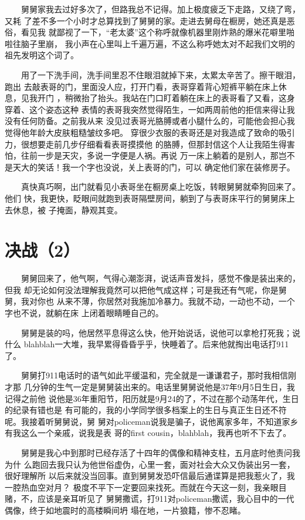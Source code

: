 \documentclass[12pt]{book}
\begin{document}
　　舅舅家我去过好多次了，但路我总不记得。加上极度疲乏下走路，又绕了弯，又耗
了差不多一个小时才总算找到了舅舅的家。走进去舅母在橱房，她还真是恶俗，看见我
就鄙视了一下，“老太婆”这个称呼就像机器里刚炸熟的爆米花噼里啪啦往脑子里崩，
我小声在心里叫上千遍万遍，不这么称呼她太对不起我们文明的祖先发明这个词了。

　　用了一下洗手间，洗手间里忍不住眼泪就掉下来，太累太辛苦了。擦干眼泪，跑出
去敲表哥的门，里面没人应，打开门看，表哥穿着背心短裤平躺在床上休息，见我开门
，稍微抬了抬头。我站在门口盯着躺在床上的表哥看了又看，这身穿着、这个姿态这种
表情的表哥我突然觉得陌生，一如两周前他的拒信来得让我没有任何防备。之前我从来
没见过表哥光胳膊或者小腿什么的，可能他会担心我觉得他年龄大皮肤粗糙皱纹多吧。
穿很少衣服的表哥还是对我造成了致命的吸引力，很想要走前几步仔细看看表哥摸摸他
的胳膊，但那封信这个人让我陌生得害怕，往前一步是天灾，多说一字便是人祸。再说
万一床上躺着的是别人，那岂不是天大的笑话！我一个字也没说，关上表哥的门，可以
确定他们家在装修房子。

　　真快真巧啊，出门就看见小表哥坐在橱房桌上吃饭，转眼舅舅就牵狗回来了。他们
快，我更快，眨眼间就跑到表哥隔壁房间，躺到了与表哥床平行的舅舅床上去休息，被
子掩面，静观其变。
\section{决战（2）}
\label{sec-8-31}

　　舅舅回来了，他气啊，气得心潮澎湃，说话声音发抖，感觉不像是装出来的，但我
却无论如何没法理解我竟然可以把他气成这样；可是我还有气呢，你是舅舅，我对你也
从来不薄，你居然对我施加冷暴力。我就不动，一动也不动，一个字也不说，就躺在床
上闭着眼睛睡自己的。

　　舅舅是装的吗，他居然平息得这么快，他开始说话，说他可以拿枪打死我；说什么
blahblah一大堆，我早累得昏昏乎乎，快睡着了。后来他就掏出电话打911了。

　　舅舅打911电话时的语气如此平缓温和，完全就是一谦谦君子，那时我相信刚才那
几分钟的生气一定是舅舅装出来的。电话里舅舅说他是37年9月5日生日，我记得之前他
说他是36年重阳节，阳历就是9月24的了，不过在那个动荡年代，生日的纪录有错也是
有可能的，我的小学同学很多档案上的生日与真正生日还不符呢。我接着听舅舅说，舅
舅对policeman说我是骗子，说他离家多年，不知道家乡有我这么一个亲戚，说我是表
哥的first cousin，blahblah，我再也听不下去了。

　　舅舅是我心中到那时已经存活了十四年的偶像和精神支柱，五月底时他责问我为什
么跑回去我只认为他世俗虚伪，心里一套，面对社会大众又伪装出另一套，很好理解所
以后来就没当回事。直到舅舅发恐吓信最后通谍算是把我惹火了，我一腔热血空对月？
极度不平下一定要回来找死。而就在今天这一刻，我亲眼目赌，不，应该是亲耳听见了
舅舅撒谎，打911对policeman撒谎，我心目中的一代偶像，终于如地震时的高楼瞬间坍
塌在地，一片狼籍，惨不忍睹。
\end{document}
